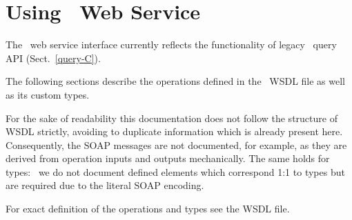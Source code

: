 
\section{Using \LB\ Web Service}


The \LB\ web service interface currently reflects the functionality of legacy
\LB\ query API (Sect.~\ref{query-C}).

The following sections describe the operations defined in the \LB\ WSDL
file as well as its custom types.

For the sake of readability this documentation does not follow the structure
of WSDL strictly, avoiding to duplicate information which is already present
here.
Consequently, the SOAP messages are not documented, for example, as they
are derived from operation inputs and outputs mechanically.
The same holds for types: \eg\ we do not document defined elements
which correspond 1:1 to types but are required due to the literal SOAP
encoding.

For exact definition of the operations and types see the WSDL file.

